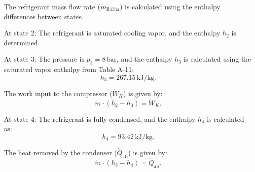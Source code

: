 The refrigerant mass flow rate (\(\dot{m}_{\text{R134a}}\)) is calculated using the enthalpy differences between states.  

At state 2:  
The refrigerant is saturated cooling vapor, and the enthalpy \(h_2\) is determined.  

At state 3:  
The pressure is \(p_3 = 8 \, \text{bar}\), and the enthalpy \(h_3\) is calculated using the saturated vapor enthalpy from Table A-11:  
\[
h_3 = 267.15 \, \text{kJ/kg}.
\]  

The work input to the compressor (\(\dot{W}_K\)) is given by:  
\[
\dot{m} \cdot (h_2 - h_3) = \dot{W}_K.
\]  

At state 4:  
The refrigerant is fully condensed, and the enthalpy \(h_4\) is calculated as:  
\[
h_4 = 93.42 \, \text{kJ/kg}.
\]  

The heat removed by the condenser (\(\dot{Q}_{\text{ab}}\)) is given by:  
\[
\dot{m} \cdot (h_3 - h_4) = \dot{Q}_{\text{ab}}.
\]